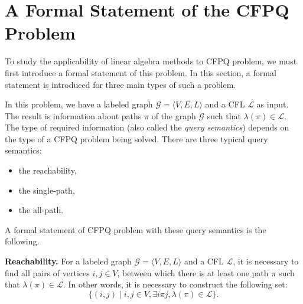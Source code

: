 \section{A Formal Statement of the CFPQ Problem}\label{sec:ch1/sec4}
To study the applicability of linear algebra methods to CFPQ problem, we must first introduce a formal statement of this problem. In this section, a formal statement is introduced for three main types of such a problem.

In this problem, we have a labeled graph $\mathcal{G} = \langle V, E, L \rangle$ and a CFL $\mathcal{L}$ as input. The result is information about paths $\pi$ of the graph $\mathcal{G}$ such that $\lambda(\pi) \in \mathcal{L}$. The type of required information (also called the \textit{query semantics}) depends on the type of a CFPQ problem being solved. There are three typical query semantics:

\begin{itemize}
\item the reachability,
\item the single-path,
\item the all-path.
\end{itemize}

A formal statement of CFPQ problem with these query semantics is the following.

\textbf{Reachability.} For a labeled graph $\mathcal{G} = \langle V, E, L \rangle$ and a CFL $\mathcal{L}$, it is necessary to find all pairs of vertices $i, j \in V$, between which there is at least one path $\pi$ such that $\lambda(\pi) \in \mathcal{L}$. In other words, it is necessary to construct the following set: $$\{(i, j) \mid i, j \in V, \exists i \pi j, \lambda(\pi) \in \mathcal{L}\}.$$

